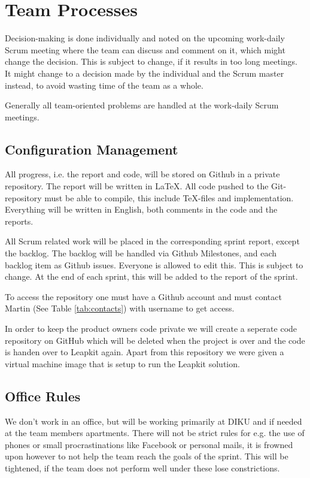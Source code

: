 \section{Team Processes}

Decision-making is done individually and noted on the upcoming work-daily Scrum meeting where the team can discuss and comment on it, which might change the decision. This is subject to change, if it results in too long meetings. It might change to a decision made by the individual and the Scrum master instead, to avoid wasting time of the team as a whole.

Generally all team-oriented problems are handled at the work-daily Scrum meetings.

\subsection{Configuration Management}
All progress, i.e. the report and code, will be stored on Github in a private repository.
The report will be written in \LaTeX.
All code pushed to the Git-repository must be able to compile, this include \TeX-files and implementation.
Everything will be written in English, both comments in the code and the reports.

All Scrum related work will be placed in the corresponding sprint report, except the backlog. The backlog will be handled via Github Milestones, and each backlog item as Github issues. Everyone is allowed to edit this. This is subject to change. At the end of each sprint, this will be added to the report of the sprint.

To access the repository one must have a Github account and must contact Martin (See Table \ref{tab:contacts}) with username to get access.

In order to keep the product owners code private we will create a seperate code repository on GitHub which will be deleted when the project is over and the code is handen over to Leapkit again. Apart from this repository we were given a virtual machine image that is setup to run the Leapkit solution.

\subsection{Office Rules}
We don't work in an office, but will be working primarily at DIKU and if needed at the team members apartments. There will not be strict rules for e.g. the use of phones or small procrastinations like Facebook or personal mails, it is frowned upon however to not help the team reach the goals of the sprint. This will be tightened, if the team does not perform well under these lose constrictions.
